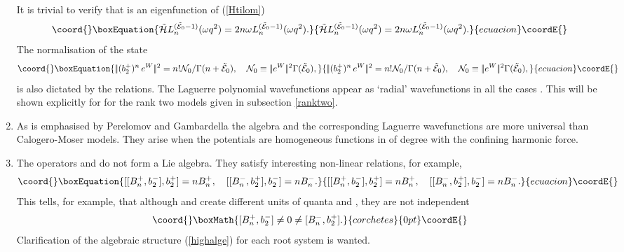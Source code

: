 \documentclass[a4paper,12pt]{article}
\begin{document}
\begin{enumerate}
It is trivial to verify that \coordHE{}
is an eigenfunction of \coordHE{} (\ref{Htilom})
\begin{equation}\coord{}\boxEquation{
   \tilde{\cal H}L^{(\tilde {\cal E}_0-1)}_n(\omega q^2)=
   2n\omega L^{(\tilde
   {\cal E}_0-1)}_n(\omega q^2).
}{
   \tilde{\cal H}L^{(\tilde {\cal E}_0-1)}_n(\omega q^2)=
   2n\omega L^{(\tilde
   {\cal E}_0-1)}_n(\omega q^2).
}{ecuacion}\coordE{}\end{equation}
The normalisation of the state
\begin{equation}\coord{}\boxEquation{
   |\!|(b_2^+)^n\,e^W|\!|^2=n!{\cal N}_0/\Gamma(n+\tilde
   {\cal E}_0),\quad {\cal N}_0\equiv|\!|e^W|\!|^2\Gamma(\tilde
   {\cal E}_0),
}{
   |\!|(b_2^+)^n\,e^W|\!|^2=n!{\cal N}_0/\Gamma(n+\tilde
   {\cal E}_0),\quad {\cal N}_0\equiv|\!|e^W|\!|^2\Gamma(\tilde
   {\cal E}_0),
}{ecuacion}\coordE{}\end{equation}
is also dictated by the \coordHE{} relations.
The Laguerre polynomial wavefunctions appear as `radial' wavefunctions
in all the cases \cite{Cal1}.
This will be shown explicitly for
for the rank two models given in subsection \ref{ranktwo}.
\item
As is emphasised by Perelomov \cite{Pere1} and Gambardella \cite{Gamb}
the \coordHE{} algebra and the corresponding
Laguerre wavefunctions
are more universal than Calogero-Moser models.
They arise when the potentials are homogeneous functions
in \coordHE{} of degree
\coordHE{} with the confining harmonic force.
\item
The operators \coordHE{} and \coordHE{} do not form a Lie algebra.
They satisfy interesting non-linear relations, for example,
\begin{equation}\coord{}\boxEquation{
   [[B_n^+,b_2^-],b_2^+]=nB_n^+,\quad
   [[B_n^-,b_2^+],b_2^-]=nB_n^-.
   \label{highalge}
}{
   [[B_n^+,b_2^-],b_2^+]=nB_n^+,\quad
   [[B_n^-,b_2^+],b_2^-]=nB_n^-.
   }{ecuacion}\coordE{}\end{equation}
This tells, for example, that although \coordHE{} and \coordHE{}
create different units of quanta \coordHE{} and \coordHE{}, they are not independent
\[\coord{}\boxMath{
   [B_n^+,b_2^-]\neq0\neq [B_n^-,b_2^+].
}{corchetes}{0pt}\coordE{}\]
Clarification of the algebraic structure (\ref{highalge}) for each root
system is wanted.
\end{enumerate}
\end{document}
